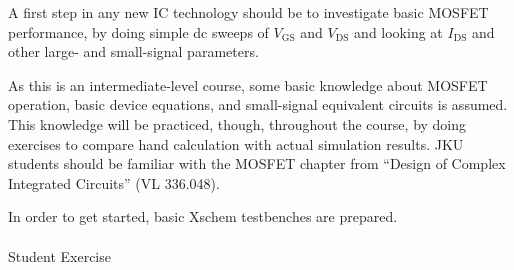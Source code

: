 \documentclass[
  letterpaper,
  DIV=11,
  numbers=noendperiod]{scrartcl}
\makeatletter
\let\oldparagraph\paragraph
\renewcommand{\paragraph}{
    \@ifstar
      \xxxParagraphStar
      \xxxParagraphNoStar
  }
\newcommand{\xxxParagraphStar}[1]{\oldparagraph*{#1}\mbox{}}
\newcommand{\xxxParagraphNoStar}[1]{\oldparagraph{#1}\mbox{}}
\makeatother
\begin{document}
A first step in any new IC technology should be to investigate basic
MOSFET performance, by doing simple dc sweeps of \(V_\mathrm{GS}\) and
\(V_\mathrm{DS}\) and looking at \(I_\mathrm{DS}\) and other large- and
small-signal parameters.

As this is an intermediate-level course, some basic knowledge about
MOSFET operation, basic device equations, and small-signal equivalent
circuits is assumed. This knowledge will be practiced, though,
throughout the course, by doing exercises to compare hand calculation
with actual simulation results. JKU students should be familiar with the
MOSFET chapter from ``Design of Complex Integrated Circuits'' (VL
336.048).

In order to get started, basic Xschem testbenches are prepared.

\paragraph{Student Exercise}\label{student-exercise}
\end{document}
